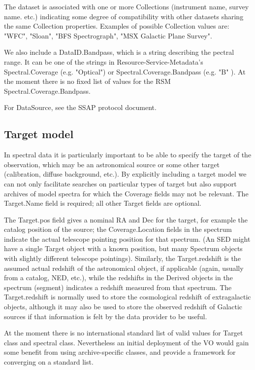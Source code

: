 \documentclass[11pt]{article}
\begin{document}
The dataset is associated with one or more Collections (instrument
name, survey name. etc.) indicating some degree of compatibility with other
datasets sharing the same Collection properties. Examples of possible
Collection values are: "WFC", "Sloan", "BFS Spectrograph", "MSX
Galactic Plane Survey".

We also include a DataID.Bandpass, which is a string describing the
pectral range. It can be one of the strings in Resource-Service-Metadata's
Spectral.Coverage (e.g. "Optical") or Spectral.Coverage.Bandpass (e.g. "B" ).
At the moment there is no fixed list of values for the RSM
Spectral.Coverage.Bandpass.


For DataSource, see the SSAP protocol document.

\subsection{Target model}


In spectral data it is particularly important to be able to
specify the target of the observation, which may be an astronomical
source or some other target (calibration, diffuse background, etc.).
By explicitly including a target model we
can not only facilitate searches on particular types of target
but also support archives of model spectra for which the Coverage
fields may not be relevant.
The Target.Name field is required; all other Target fields are optional. 


The Target.pos field
gives a nominal RA and Dec for the target, for example the catalog
position of the source; the Coverage.Location fields in the
spectrum  indicate the actual telescope pointing position for that
spectrum. (An SED might have a single Target object with a known
position, but many
Spectrum objects with slightly different telescope pointings).
Similarly, the Target.redshift is the assumed actual
redshift of the  astronomical object, if applicable (again,
usually from a catalog, NED, etc.), while the redshifts in the
Derived objects in the spectrum (segment) indicates a redshift measured from
that spectrum. The Target.redshift is normally used to store the
cosmological redshift of extragalactic objects, although it may
also be used to store the observed redshift of Galactic sources if that
information is felt by the data provider to be useful.

At the moment there is no international standard list of
valid values for Target class and spectral class. Nevertheless
an initial deployment of the VO would gain some benefit from
using archive-specific classes, and provide a framework for
converging on a standard list.
\end{document}
